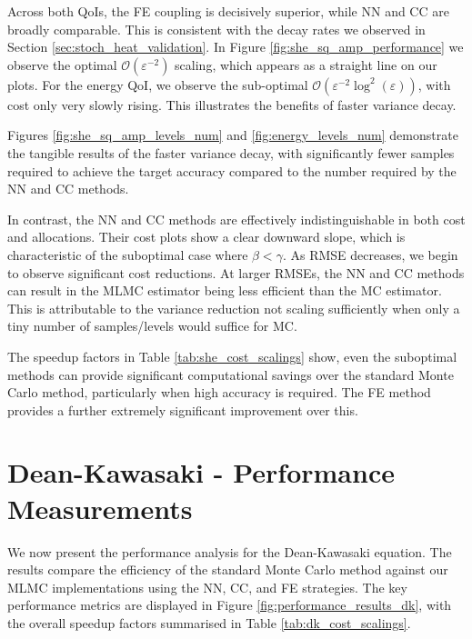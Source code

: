 Across both QoIs, the FE coupling is decisively superior, while NN and CC are broadly comparable. 
This is consistent with the decay rates we observed in Section 
\ref{sec:stoch_heat_validation}. In Figure 
\ref{fig:she_sq_amp_performance} we observe the optimal 
$\mathcal{O}(\varepsilon^{-2})$ scaling, which appears as a straight line on our plots. For 
the energy QoI, we observe the sub-optimal $\mathcal{O}(\varepsilon^{-2}\log^2(\varepsilon))$,
with cost only very slowly rising. This illustrates the benefits of 
faster variance decay.

Figures \ref{fig:she_sq_amp_levels_num} and \ref{fig:energy_levels_num}
demonstrate the tangible results of the faster variance decay, with significantly
fewer samples required to achieve the target accuracy compared to the number 
required by the NN and CC methods.

In contrast, the NN and CC methods are effectively indistinguishable
in both cost and allocations.
Their cost plots show a clear downward slope, which is 
characteristic of the suboptimal case where $\beta < \gamma$. As RMSE decreases, 
we begin to observe significant cost reductions.
At larger RMSEs, the NN and CC methods can result in 
the MLMC estimator being less efficient than the MC estimator. 
This is attributable to the variance reduction not 
scaling sufficiently when only a tiny number of samples/levels 
would suffice for MC.

The speedup factors in Table 
\ref{tab:she_cost_scalings} show, even the suboptimal methods can provide 
significant computational savings over the standard Monte 
Carlo method, particularly when high accuracy is required. The FE method 
provides a further extremely significant improvement over this.

\section{Dean-Kawasaki - Performance Measurements}

We now present the performance analysis for the Dean-Kawasaki equation. The results compare 
the efficiency of the standard Monte Carlo method against our MLMC implementations using 
the NN, CC, and FE strategies. The key performance metrics are displayed in 
Figure \ref{fig:performance_results_dk}, with the overall speedup factors 
summarised in Table \ref{tab:dk_cost_scalings}.



